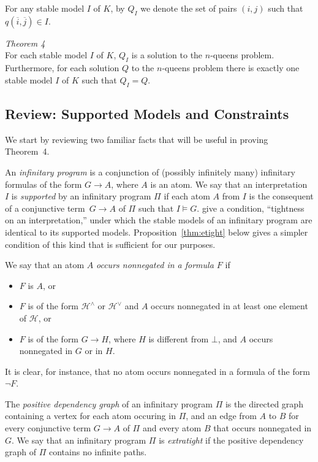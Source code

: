 \documentclass{tlp_mod}
\def\o{\overline}
\def\rar{\rightarrow}
\begin{document}
For any stable model $I$ of $K$, by $Q_I$ we denote the set of 
pairs $(i, j)$ such that $q(\o i, \o j) \in I$.

\medskip

\noindent\emph{Theorem 4}\\
For each stable model $I$ of $K$, $Q_I$ is a 
solution to the $n$-queens problem.  Furthermore, for each solution $Q$ to 
the $n$-queens problem there is exactly one stable model $I$ of $K$ such that
$Q_I = Q$.

\medskip

\subsection*{Review: Supported Models and Constraints}

We start by reviewing two familiar facts that will be 
useful in proving Theorem~4.  

An {\sl infinitary program} is a conjunction of (possibly infinitely 
many) infinitary formulas of the form $G \rar A$, where $A$ is an atom.
We say that an interpretation $I$ is 
{\sl supported} by an infinitary program $\Pi$ if each atom $A$ from $I$ is 
the consequent of a conjunctive term~$G\rar A$ of $\Pi$ such that $I\models G$. 
 \citeyear{lif13a} give a condition, ``tightness on an 
interpretation,''  under which the stable models of
an infinitary program are identical to its supported models. 
Proposition~\ref{thm:etight} below
gives a simpler condition of this kind that is sufficient for our purposes. 

We say that an atom $A$ {\sl occurs nonnegated in a formula $F$} if 
\begin{itemize}
\item $F$ is $A$, or 
\item $F$ is of the form $\mathcal{H}^\land$ or $\mathcal{H}^\lor$ and $A$ occurs nonnegated in at least one element of $\mathcal{H}$, or
\item $F$ is of the form $G \rar H$, where $H$ is different from $\bot$, and 
$A$ occurs nonnegated in $G$ or in $H$. 
\end{itemize}
It is clear, for instance, that no atom occurs nonnegated in a formula of the
form $\neg F$. 

The {\sl positive dependency graph} of an infinitary program $\Pi$ is the
directed graph containing a vertex for each atom occuring in $\Pi$, and an 
edge from $A$ to $B$ for every conjunctive term $G \rar A$ of $\Pi$ and every
atom $B$ that occurs nonnegated in $G$.
We say that an infinitary program $\Pi$ is {\sl extratight} 
if the positive dependency graph of $\Pi$ contains no infinite paths.  
 
\end{document}
